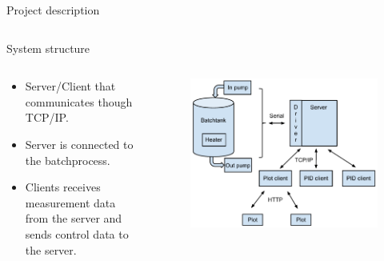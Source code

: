 \documentclass{beamer}
\begin{document}
\begin{frame}{Project description}
\begin{columns}[T]
\begin{column}{.45\textwidth}
    \end{column}
\end{columns}
\end{frame}

\begin{frame}{System structure}
\begin{columns}[T]
    \begin{column}{.55\textwidth}
        \begin{itemize}
            \item Server/Client that communicates though TCP/IP.
            \item Server is connected to the batchprocess.
            \item Clients receives measurement data from the server and sends control data to the server.
        \end{itemize}
    \end{column}
    \begin{column}{.45\textwidth}

        \begin{figure}[H]
           \centering
           \includegraphics[width=1\textwidth]{systemoverview.pdf}
        \end{figure}

    \end{column}
\end{columns}
\end{frame}
\end{document}
